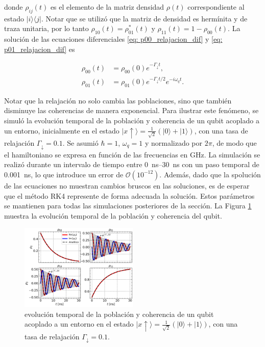 \noindent donde \(\rho_{ij}(t)\) es el elemento de la matriz densidad \(\rho(t)\) correspondiente al estado \(|i\rangle\langle j|\). Notar que se utilizó que la matriz de densidad es hermínita y de traza unitaria, por lo tanto \(\rho_{10}(t) = \rho_{01}^*(t)\) y \(\rho_{11}(t) = 1 - \rho_{00}(t)\). La solución de las ecuaciones diferenciales \ref{eq: p00_relajacion_dif} y \ref{eq: p01_relajacion_dif} es

\begin{align}
    \rho_{00}(t) &= \rho_{00}(0) e^{-\Gamma_\downarrow t} \label{eq: p00_relajacion_sol}, \\
    \rho_{01}(t) &= \rho_{01}(0)e^{- \Gamma_\downarrow t / 2} e^{-i \omega_q t}   \label{eq: p01_relajacion_sol}.
\end{align}

Notar que la relajación no solo cambia las poblaciones, sino que también disminuye las coherencias de manera exponencial. Para ilustrar este fenómeno, se simuló la evolución temporal de la población y coherencia de un qubit acoplado a un entorno, inicialmente en el estado \(|x\uparrow\rangle = \frac{1}{\sqrt{2}}(|0\rangle + |1\rangle)\), con una tasa de relajación \(\Gamma_\downarrow = 0.1\). Se asumió \(\hbar = 1\), \(\omega_q = 1\) y normalizado por \(2\pi\), de modo que el hamiltoniano se expresa en función de las frecuencias en \si{\giga\hertz}. La simulación se realizó durante un intervalo de tiempo entre \SIrange{0}{30}{\nano\second} con un paso temporal de \SI{0.001}{\nano\second}, lo que introduce un error de \(\mathcal{O}(10^{-12})\). Además, dado que la spolución de las ecuaciones no muestran cambios bruscos en las soluciones, es de esperar que el método RK4 represente de forma adecuada la solución. Estos parámetros se mantienen para todas las simulaciones posteriores de la sección. La Figura \ref{fig: x_plus_relaxation} muestra la evolución temporal de la población y coherencia del qubit.

\begin{figure} [htbp]
    \centering
    \includegraphics[width=0.5\textwidth]{figures/x_plus_relaxation.pdf}
    \caption{evolución temporal de la población y coherencia de un qubit acoplado a un entorno en el estado \(|x\uparrow\rangle = \frac{1}{\sqrt{2}}(|0\rangle + |1\rangle)\), con una tasa de relajación \(\Gamma_\downarrow = 0.1\).}
    \label{fig: x_plus_relaxation}
\end{figure}

